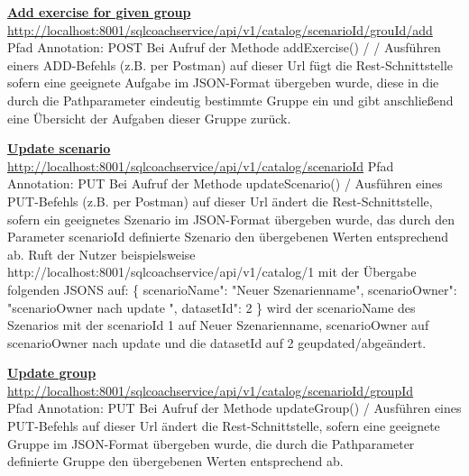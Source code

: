 \documentclass[fleqn,10pt,ngerman]{SelfArx}
\begin{document}
	\noindent
	\underline{\textbf{Add exercise for given group}}\newline
	\underline{http://localhost:8001/sqlcoachservice/api/v1/catalog}\newline\underline{/{scenarioId}/{grouId}/add}\newline
		Pfad Annotation: POST\newline
	Bei Aufruf der Methode addExercise() / / Ausführen einers ADD-Befehls (z.B. per Postman)  auf dieser Url fügt die Rest-Schnittstelle sofern eine geeignete Aufgabe im JSON-Format übergeben wurde, diese in die durch die Pathparameter eindeutig bestimmte Gruppe ein und gibt anschließend eine Übersicht der Aufgaben dieser Gruppe zurück.
	\newline\newline
	
	\noindent
	\underline{\textbf{Update scenario}}\newline
	\underline{http://localhost:8001/sqlcoachservice/api/v1/catalog}\newline\underline{/{scenarioId}}\newline
	Pfad Annotation: PUT\newline
	Bei Aufruf der Methode updateScenario() / Ausführen eines PUT-Befehls (z.B. per Postman) auf dieser Url ändert die Rest-Schnittstelle, sofern ein geeignetes Szenario im JSON-Format übergeben wurde, das durch den Parameter scenarioId definierte Szenario den übergebenen Werten entsprechend ab. 
	Ruft der Nutzer beispielsweise \newline http://localhost:8001/sqlcoachservice/api/v1/catalog/1 mit der Übergabe folgenden JSONS auf:\newline
	 \{      \newline
		\grqq scenarioName": "Neuer Szenarienname",\newline
		\grqq scenarioOwner": "scenarioOwner nach update ",\newline
		\grqq datasetId": 2\newline
	\}\newline
	wird der scenarioName des Szenarios mit der scenarioId 1 auf Neuer Szenarienname, scenarioOwner auf scenarioOwner nach update und die datasetId auf 2 geupdated/abgeändert.
	\newline\newline
	
	\noindent
		\underline{\textbf{Update group}}\newline
	\underline{http://localhost:8001/sqlcoachservice/api/v1/catalog}\newline\underline{/{scenarioId}/{groupId}}\newline\\
	Pfad Annotation: PUT\newline
	Bei Aufruf der Methode updateGroup() / Ausführen eines PUT-Befehls auf dieser Url ändert die Rest-Schnittstelle, sofern eine geeignete Gruppe im JSON-Format übergeben wurde, die durch die Pathparameter definierte Gruppe den übergebenen Werten entsprechend ab. 
	\newline\newline
\end{document}
